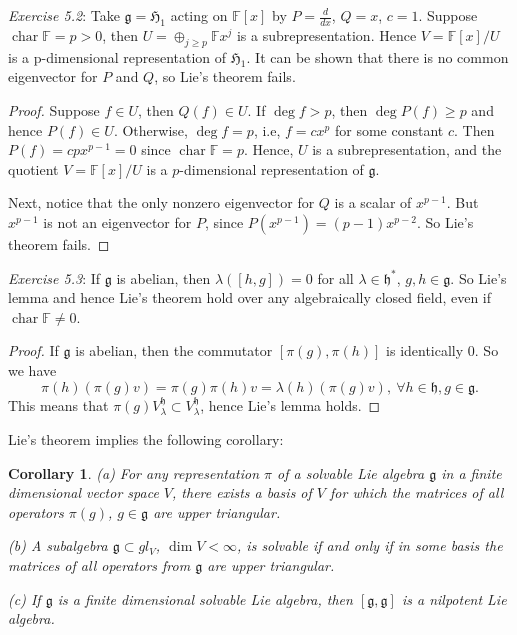 \documentclass[10pt,twoside]{article}
\newcommand{\Ff}{\mathbb F}
\newcommand{\mg}{\mathfrak{g}}
\newcommand{\mh}{\mathfrak{h}}
\newtheorem{corollary}[theorem]{Corollary}
\theoremstyle{definition}
\theoremstyle{remark}
\begin{document}
\noindent
{\em Exercise 5.2}: Take $\mg=\mathfrak{H}_1$ acting on $\Ff [x]$ by $P=\frac{d}{dx}$, $Q=x$, $c=1$.  Suppose $\operatorname{char}\Ff=p>0$, then $U=\oplus_{j\geq p}\Ff x^j$ is a subrepresentation.  Hence $V=\Ff [x]/U$ is a p-dimensional representation of $\mathfrak{H}_1$.  It can be shown that there is no common eigenvector for $P$ and $Q$, so Lie's theorem fails. 

\begin{proof}

Suppose $f\in U$, then $Q(f)\in U$. If $\deg f>p$, then $\deg P(f) \geq p$ and hence $P(f) \in U$.  Otherwise, $\deg f=p$, i.e, $f=c x^p$ for some constant $c$.  Then $P(f)=cpx^{p-1}=0$ since $\operatorname{char} \Ff =p$.  Hence, $U$ is a subrepresentation, and the quotient $V=\Ff [x]/U$ is a $p$-dimensional representation of $\mg$.  

Next, notice that the only nonzero eigenvector for $Q$ is a scalar of $x^{p-1}$.  But $x^{p-1}$ is not an eigenvector for $P$, since $P(x^{p-1})=(p-1)x^{p-2}$.  So Lie's theorem fails.  

\end{proof}


\noindent
{\em Exercise 5.3}: If $\mg$ is abelian, then $\lambda([h,g])=0$ for all $\lambda \in \mh^*$, $g,h\in \mg$.  So Lie's lemma and hence Lie's theorem hold over any algebraically closed field, even if $\operatorname{char} \Ff \neq 0$. 

\begin{proof}
If $\mg$ is abelian, then the commutator $[\pi(g), \pi(h)]$ is identically 0.  So we have $$\pi(h)(\pi(g)v)=\pi(g)\pi(h)v=\lambda(h)(\pi(g)v), \ \forall h \in \mh, g \in \mg.$$  This means that $\pi(g)V_{\lambda}^\mh \subset V^\mh_\lambda$, hence Lie's lemma holds.


\end{proof}


Lie's theorem implies the following corollary:  
\begin{corollary} 

(a)\; For any representation $\pi$ of a solvable Lie algebra $\mg$ in a finite dimensional vector space $V$, there exists a basis of $V$ for which the matrices of all operators $\pi(g)$, $g\in \mg$ are upper triangular.

(b)\; A subalgebra $\mg \subset gl_V$, $\operatorname{dim}V < \infty$, is solvable if and only if in some basis the matrices of all operators from $\mg$ are upper triangular.

(c) \;  If $\mg$ is a finite dimensional solvable Lie algebra, then $[\mg,\mg]$ is a nilpotent Lie algebra. 
 

\end{corollary}
\end{document}
